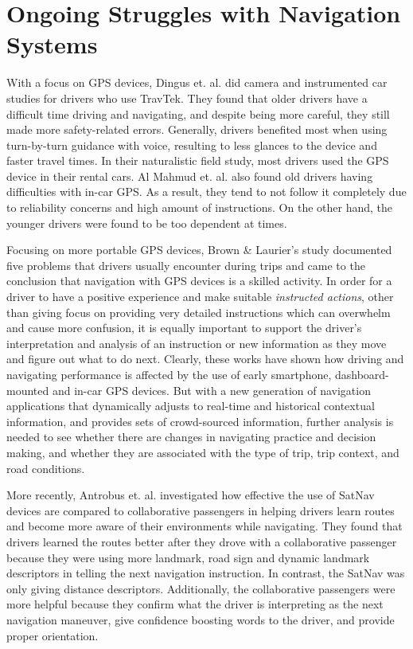 \section{Ongoing Struggles with Navigation Systems}

With a focus on GPS devices, Dingus et. al. \cite{Dingus1997a} did camera and instrumented car studies for drivers who use TravTek. They found that older drivers have a difficult time driving and navigating, and despite being more careful, they still made more safety-related errors. Generally, drivers benefited most when using turn-by-turn guidance with voice, resulting to less glances to the device and faster travel times. In their naturalistic field study, most drivers used the GPS device in their rental cars. Al Mahmud et. al. \cite{Mahmud2009UserDrivers} also found old drivers having difficulties with in-car GPS. As a result, they tend to not follow it completely due to reliability concerns and high amount of instructions. On the other hand, the younger drivers were found to be too dependent at times. 

Focusing on more portable GPS devices, Brown \& Laurier's study \cite{Brown2012TheGPS} documented five problems that drivers usually encounter during trips and came to the conclusion that navigation with GPS devices is a skilled activity. In order for a driver to have a positive experience and make suitable \emph{instructed actions}, other than giving focus on providing very detailed instructions which can overwhelm and cause more confusion, it is equally important to support the driver's interpretation and analysis of an instruction or new information as they move and figure out what to do next. Clearly, these works have shown how driving and navigating performance is affected by the use of early smartphone, dashboard-mounted and in-car GPS devices. But with a new generation of navigation applications that dynamically adjusts to real-time and historical contextual information, and provides sets of crowd-sourced information, further analysis is needed to see whether there are changes in navigating practice and decision making, and whether they are associated with the type of trip, trip context, and road conditions. 

More recently, Antrobus et. al. investigated how effective the use of SatNav devices are compared to collaborative passengers in helping drivers learn routes and become more aware of their environments while navigating\cite{Antrobus2017Driver-PassengerSystems}. They found that drivers learned the routes better after they drove with a collaborative passenger because they were using more landmark, road sign and dynamic landmark descriptors in telling the next navigation instruction. In contrast, the SatNav was only giving distance descriptors. Additionally, the collaborative passengers were more helpful because they  confirm what the driver is interpreting as the next navigation maneuver, give confidence boosting words to the driver, and provide proper orientation.

